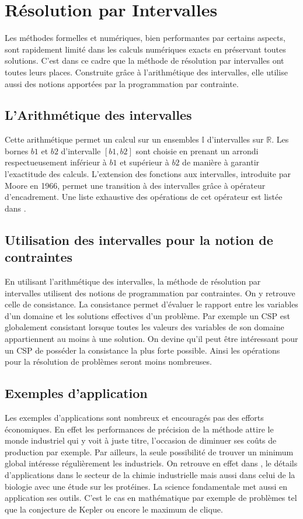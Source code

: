 \section{Résolution par Intervalles}
Les méthodes formelles et numériques, bien performantes par certains aspects, sont rapidement limité dans les calculs numériques exacts en préservant toutes solutions. C'est dans ce cadre que la méthode de résolution par intervalles ont toutes leurs places. Construite grâce à l'arithmétique des intervalles, elle utilise aussi des notions apportées par la programmation par contrainte.
 
\subsection{L'Arithmétique des intervalles}
Cette arithmétique permet un calcul sur un ensembles $\mathbb{I}$ d'intervalles sur $\mathbb{R}$. Les bornes $b1$ et $b2$ d'intervalle $[b1,b2]$ sont choisie en prenant un arrondi respectueusement inférieur à $b1$ et supérieur à $b2$ de manière à garantir l'exactitude des calculs. L'extension des fonctions aux intervalles, introduite par Moore en 1966, permet une transition à des intervalles grâce à opérateur d'encadrement. Une liste exhaustive des opérations de cet opérateur est listée dans \cite{Jermann}.



\subsection{Utilisation des intervalles pour la notion de contraintes}
En utilisant l'arithmétique des intervalles, la méthode de résolution par intervalles utilisent des notions de programmation par contraintes. On y retrouve celle de consistance. La consistance permet d'évaluer le rapport entre les variables d'un domaine et les solutions effectives d'un problème. Par exemple un CSP est globalement consistant lorsque toutes les valeurs des variables de son domaine appartiennent au moins à une solution. On devine qu'il peut être intéressant pour un CSP de posséder la consistance la plus forte possible. Ainsi les opérations pour la résolution de problèmes seront moins nombreuses. 


\subsection{Exemples d'application}
Les exemples d'applications sont nombreux et encouragés pas des efforts économiques. En effet les performances de précision de la méthode attire le monde industriel qui y voit à juste titre, l'occasion de diminuer ses coûts de production par exemple. Par ailleurs, la seule possibilité de trouver un minimum global intéresse régulièrement les industriels. On retrouve en effet dans \cite{Schichl}, le détails d'applications dans le secteur de la chimie industrielle mais aussi dans celui de la biologie avec une étude sur les protéines.
 La science fondamentale met aussi en application ses outils. C'est le cas en mathématique par exemple de problèmes tel que la conjecture de Kepler ou encore le  maximum de clique.
